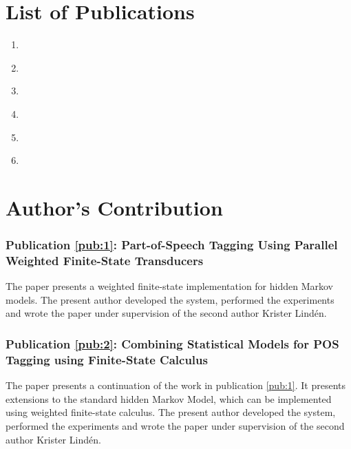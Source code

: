 \chapter*{List of Publications}
\nobibliography*
\begin{enumerate}[label=\textbf{\Roman*}]
\item\label{pub:1}\noindent{}\\[1cm]

\item\label{pub:2}\noindent{}\\[1cm]

\item\label{pub:3}\noindent{}\\[1cm]

\item\label{pub:4}\noindent{}\\[1cm]

\item\label{pub:5}\noindent{}\\[1cm]

\item\label{pub:6}\noindent{}
\end{enumerate}
\chapter*{Author's Contribution}
\subsection*{\bf Publication \ref{pub:1}: Part-of-Speech Tagging Using Parallel Weighted Finite-State Transducers}
\noindent The paper presents a weighted finite-state
implementation for hidden Markov models. The present author developed
the system, performed the experiments and wrote the paper under
supervision of the second author Krister Lind\'{e}n.

\subsection*{\bf Publication \ref{pub:2}: Combining Statistical Models for {POS} Tagging using Finite-State Calculus}
\noindent The paper presents a continuation of the work in publication
\ref{pub:1}. It presents extensions to the standard hidden Markov
Model, which can be implemented using weighted
finite-state calculus. The present author developed the system,
performed the experiments and wrote the paper under supervision of
the second author Krister Lind\'{e}n.

